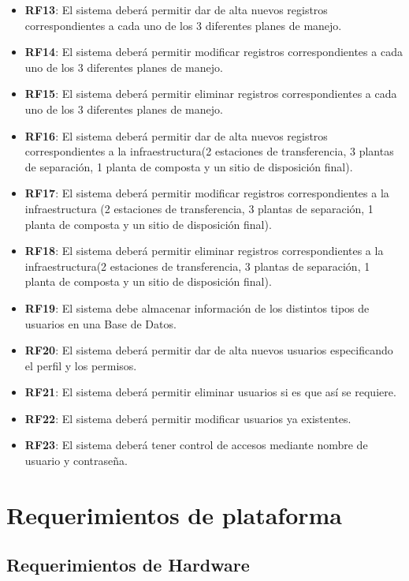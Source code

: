 \begin{itemize}
		\item \textbf{RF13}: El sistema deberá permitir dar de alta nuevos registros correspondientes a cada uno de los 3 diferentes planes de manejo.
		\item \textbf{RF14}: El sistema deberá permitir modificar registros correspondientes a cada uno de los 3 diferentes planes de manejo.
		\item \textbf{RF15}: El sistema deberá permitir eliminar registros correspondientes a cada uno de los 3 diferentes planes de manejo.
		\item \textbf{RF16}: El sistema deberá permitir dar de alta nuevos registros correspondientes a la infraestructura(2 estaciones de transferencia, 3 plantas de separación, 1 planta de composta y un sitio de disposición final).
		\item \textbf{RF17}: El sistema deberá permitir modificar registros correspondientes a la infraestructura (2 estaciones de transferencia, 3 plantas de separación, 1 planta de composta y un sitio de disposición final).
		\item \textbf{RF18}: El sistema deberá permitir eliminar registros correspondientes a la infraestructura(2 estaciones de transferencia, 3 plantas de separación, 1 planta de composta y un sitio de disposición final).
		\item \textbf{RF19}: El sistema debe almacenar información de los distintos tipos de usuarios en una Base de Datos.
		\item \textbf{RF20}: El sistema deberá permitir dar de alta nuevos usuarios especificando el perfil y los permisos.
		\item \textbf{RF21}: El sistema deberá permitir eliminar usuarios si es que así se requiere.
		\item \textbf{RF22}: El sistema deberá permitir modificar usuarios ya existentes.
		\item \textbf{RF23}: El sistema deberá tener control de accesos mediante nombre de usuario y contraseña.
	\end{itemize}
\section{Requerimientos de plataforma}

\subsection{Requerimientos de Hardware}

